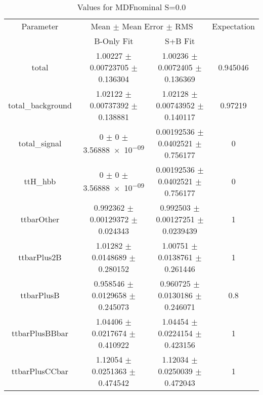 \begin{table}
\centering
\caption{Values for MDFnominal S=0.0}
\begin{tabular}{cccc}
\toprule
Parameter & \multicolumn{2}{c}{Mean $\pm$ Mean Error $\pm$ RMS} & Expectation\\
 & B-Only Fit & S+B Fit & \\
\midrule
total & \num{1.00227} $\pm$ \num{0.00723705} $\pm$ \num{0.136304} & \num{1.00236} $\pm$ \num{0.0072405} $\pm$ \num{0.136369} & \num{0.945046}\\
total\_background & \num{1.02122} $\pm$ \num{0.00737392} $\pm$ \num{0.138881} & \num{1.02128} $\pm$ \num{0.00743952} $\pm$ \num{0.140117} & \num{0.97219}\\
total\_signal & \num{0} $\pm$ \num{0} $\pm$ \num{3.56888e-09} & \num{0.00192536} $\pm$ \num{0.0402521} $\pm$ \num{0.756177} & \num{0}\\
ttH\_hbb & \num{0} $\pm$ \num{0} $\pm$ \num{3.56888e-09} & \num{0.00192536} $\pm$ \num{0.0402521} $\pm$ \num{0.756177} & \num{0}\\
ttbarOther & \num{0.992362} $\pm$ \num{0.00129372} $\pm$ \num{0.024343} & \num{0.992503} $\pm$ \num{0.00127251} $\pm$ \num{0.0239439} & \num{1}\\
ttbarPlus2B & \num{1.01282} $\pm$ \num{0.0148689} $\pm$ \num{0.280152} & \num{1.00751} $\pm$ \num{0.0138761} $\pm$ \num{0.261446} & \num{1}\\
ttbarPlusB & \num{0.958546} $\pm$ \num{0.0129658} $\pm$ \num{0.245073} & \num{0.960725} $\pm$ \num{0.0130186} $\pm$ \num{0.246071} & \num{0.8}\\
ttbarPlusBBbar & \num{1.04406} $\pm$ \num{0.0217674} $\pm$ \num{0.410922} & \num{1.04454} $\pm$ \num{0.0224154} $\pm$ \num{0.423156} & \num{1}\\
ttbarPlusCCbar & \num{1.12054} $\pm$ \num{0.0251363} $\pm$ \num{0.474542} & \num{1.12034} $\pm$ \num{0.0250039} $\pm$ \num{0.472043} & \num{1}\\
\bottomrule
\end{tabular}
\end{table}
